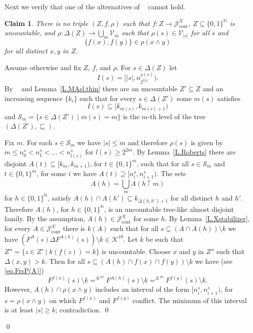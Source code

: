 \documentclass{amsart}
\makeatletter
\def\N{\mathbb N}                        %
\def\rs{\restriction}
\def\text{\mbox}
\newtheorem{claim}{Claim}
\theoremstyle{definition}
\theoremstyle{remark}
\def\twoo{\{0,1\}^{\N}}
\DeclareMathOperator{\Ccont}{cont}
\newcommand{\Jcont}{\cJ_{\Ccont}}
\newcommand{\cK}{{\mathcal K}}
\renewcommand{\proofname}{Proof}
\renewenvironment{proof}[1][\proofname]{\par
\let\oldqedsymbol\qedsymbol             %
  \normalfont
  \topsep6\p@\@plus6\p@ \trivlist
  \item[\hskip\labelsep\hskip\parindent\scshape
    #1\@addpunct{.}]\ignorespaces
}{%
  \qed\endtrivlist
\global\let\qedsymbol\oldqedsymbol      %
}
\newcommand{\cJ}{{\mathcal J}} %
\newcommand{\cV}{\mathcal V}
\DeclareMathOperator{\OCAsharp}{OCA^\#}
\newcommand{\cS}{\mathcal S}
\DeclareMathOperator{\MAsigma}{MA(\sigma-\text{linked})}
\numberwithin{claim}{subsection}
\makeatother
\begin{document}
\begin{proof}
	Next we verify that one of the alternatives of $\OCAsharp$ cannot hold. 
	
	\begin{claim}\label{C.no-triple.1}
		There is no triple $(Z,f,\rho)$ such that $f\colon Z\to \Jcont^\cK$, $Z\subseteq \twoo$ is uncountable,   and $\rho\colon \Delta(Z)\to \bigcup_m \cV_m$
 such that $\rho(s)\in \cV_{|s|}$ for all $s$ and 
		\[
		\{f(x),f(y)\}\in \rho(x\wedge y)
		\]
		for all distinct $x,y$ in $Z$. 
	\end{claim}
	\begin{proof}
		Assume otherwise and fix $Z$, $f$, and $\rho$. For $s\in \Delta(Z)$ let 
		\[
		I(s)=[|s|, n_{2^{2|s|}} ^{\rho(s)}). 
		\]
		By $\MAsigma$ and Lemma~\ref{L.MAsl.thin} there are an uncountable $Z'\subseteq Z$ and an increasing sequence $\{k_i\}$ such that for every $s\in \Delta(Z')$ some $m(s)$  satisfies 
		\[
		I(s)\subseteq [k_{m(s)}, k_{m(s)+1})
		\] 
		and $\cS_m=\{s\in \Delta(Z')\mid m(s)=m\}$ is the $m$-th level of the tree $(\Delta(Z'),\sqsubseteq)$. 
		
		Fix $m$. For each $s\in \cS_m$ we have $|s|\leq m$ and therefore $\rho(s)$ is given by $m\leq n_0^s<n_1^s<\dots <n_{l(s)}^s$ for $l(s)\geq 2^{2m}$. By Lemma~\ref{L.Roberts} there are disjoint $A(t)\subseteq [k_m,k_{m+1})$, for $t\in \{0,1\}^m$, such that for all $s\in \cS_m$ and $ t\in \{0,1\}^m$,  for some $i$ we have $A(t)\supseteq [n_i^s, n_{i+1}^s)$. The sets 
		\[
		A(h)=\bigcup_m A(h\rs m)
		\]
		for $h\in \twoo$, satisfy  $A(h)\cap A(h')\subseteq k_{\Delta(h,h')+1}$ for all distinct $h$ and $h'$. Therefore $A(h)$, for $h\in \twoo$, is an uncountable  tree-like almost disjoint family. By the assumption, $A(h)\in \Jcont^\cK$  for some $h$. By Lemma~\ref{L.Xstabilizer}, for every $A\in \Jcont^\cK$ there is $k(A)$  such that for all $s\subseteq (A\cap A(h))\setminus k$ we have $(F^A(s)\Delta F^{A(h)}(s))\setminus k\in \cK^{10}$. 
		Let $k$ be such that $Z''=\{z\in Z'\mid k(f(z))=k\}$ is uncountable. Choose $x$ and $y$ in $Z''$ such that $\Delta(x,y)>k$. Then for all $s\subseteq (A(h)\cap f(x)\cap f(y))\setminus k$  we have (see \eqref{eq.FrsP(A)})
		\[
		F^{f(x)}(s)\setminus k=^{\cK^{10}} F^{A(h)}(s)\setminus k =^{\cK^{10}} F^{f(y)} (s)\setminus k . 
		\]
		However, $A(h)\cap \rho(x\wedge y)$ includes an interval of the form $[n_i^s, n_{i+1}^s)$, for $s=\rho(x\wedge y)$ on which $F^{f(x)}$ and $F^{f(y)}$  conflict.  The minimum of this interval is at least $|s|\geq k$; contradiction. 
	\end{proof}
	

\end{proof}
\end{document}
